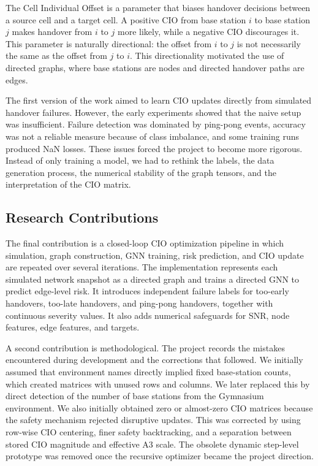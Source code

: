 \documentclass[11pt,a4paper]{article}
\begin{document}
The Cell Individual Offset is a parameter that biases handover decisions between a source cell and a target cell. A positive CIO from base station $i$ to base station $j$ makes handover from $i$ to $j$ more likely, while a negative CIO discourages it. This parameter is naturally directional: the offset from $i$ to $j$ is not necessarily the same as the offset from $j$ to $i$. This directionality motivated the use of directed graphs, where base stations are nodes and directed handover paths are edges.

The first version of the work aimed to learn CIO updates directly from simulated handover failures. However, the early experiments showed that the naive setup was insufficient. Failure detection was dominated by ping-pong events, accuracy was not a reliable measure because of class imbalance, and some training runs produced NaN losses. These issues forced the project to become more rigorous. Instead of only training a model, we had to rethink the labels, the data generation process, the numerical stability of the graph tensors, and the interpretation of the CIO matrix.

\subsection{Research Contributions}
The final contribution is a closed-loop CIO optimization pipeline in which simulation, graph construction, GNN training, risk prediction, and CIO update are repeated over several iterations. The implementation represents each simulated network snapshot as a directed graph and trains a directed GNN to predict edge-level risk. It introduces independent failure labels for too-early handovers, too-late handovers, and ping-pong handovers, together with continuous severity values. It also adds numerical safeguards for SNR, node features, edge features, and targets.

A second contribution is methodological. The project records the mistakes encountered during development and the corrections that followed. We initially assumed that environment names directly implied fixed base-station counts, which created matrices with unused rows and columns. We later replaced this by direct detection of the number of base stations from the Gymnasium environment. We also initially obtained zero or almost-zero CIO matrices because the safety mechanism rejected disruptive updates. This was corrected by using row-wise CIO centering, finer safety backtracking, and a separation between stored CIO magnitude and effective A3 scale. The obsolete dynamic step-level prototype was removed once the recursive optimizer became the project direction.
\end{document}
